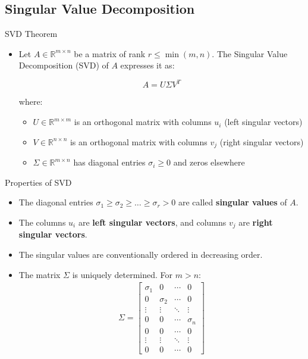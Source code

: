 \subsection{Singular Value Decomposition}
\begin{frame}{SVD Theorem}
\begin{itemize}
    \item Let \( A \in \mathbb{R}^{m \times n} \) be a matrix of rank \( r \leq \min(m, n) \). The Singular Value Decomposition (SVD) of \( A \) expresses it as:

\[
A = U \Sigma V^T
\]

where:
\begin{itemize}
    \item \( U \in \mathbb{R}^{m \times m} \) is an orthogonal matrix with columns \( u_i \) (left singular vectors)
    \item \( V \in \mathbb{R}^{n \times n} \) is an orthogonal matrix with columns \( v_j \) (right singular vectors)
    \item \( \Sigma \in \mathbb{R}^{m \times n} \) has diagonal entries \( \sigma_i \geq 0 \) and zeros elsewhere
\end{itemize}
\end{itemize}
\end{frame}

\begin{frame}{Properties of SVD}
\begin{itemize}
    \item The diagonal entries $\sigma_1 \geq \sigma_2 \geq \ldots \geq \sigma_r > 0$ are called \textbf{singular values} of $A$.
    \item The columns $u_i$ are \textbf{left singular vectors}, and columns $v_j$ are \textbf{right singular vectors}.
    \item The singular values are conventionally ordered in decreasing order.
    \item The matrix $\Sigma$ is uniquely determined. For $m > n$:
    \begin{align}
        \Sigma = \begin{bmatrix}
            \sigma_1 & 0 & \cdots & 0 \\
            0 & \sigma_2 & \cdots & 0 \\
            \vdots & \vdots & \ddots & \vdots \\
            0 & 0 & \cdots & \sigma_n \\
            0 & 0 & \cdots & 0 \\
            \vdots & \vdots & \ddots & \vdots \\
            0 & 0 & \cdots & 0
        \end{bmatrix}
    \end{align}
\end{itemize}
\end{frame}

